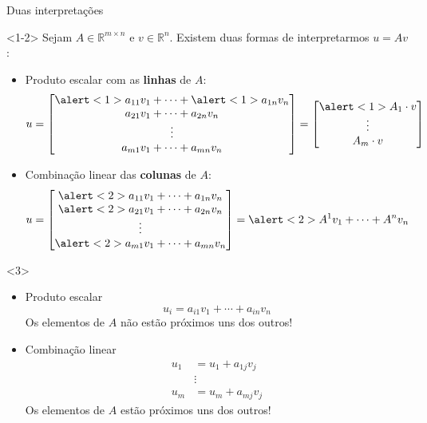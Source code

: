 \documentclass[]{beamer}
\newcommand{\R}{\mathbb{R}}
\begin{document}
\begin{frame}{Duas interpretações}
  
  \begin{onlyenv}<1-2>
    Sejam $A \in \R^{m \times n}$ e $v \in \R^n$. Existem duas formas
    de interpretarmos $u = A v$:

    \begin{itemize}
    \item Produto escalar com as \textbf{linhas} de $A$:
      \[
      u =
      \begin{bmatrix}
        \alert<1>{a_{11} v_1} + \cdots + \alert<1>{a_{1n} v_n}\\
        a_{21} v_1 + \cdots + a_{2n} v_n\\
        \vdots \\
        a_{m1} v_1 + \cdots + a_{mn} v_n
      \end{bmatrix}
      =
      \begin{bmatrix}
        \alert<1>{A_1 \cdot v} \\
        \vdots \\
        A_m \cdot v
      \end{bmatrix}
      \]

    \item Combinação linear das \textbf{colunas} de $A$:
      \[
      u =
      \begin{bmatrix}
        \alert<2>{a_{11} v_1} + \cdots + a_{1n} v_n\\
        \alert<2>{a_{21} v_1} + \cdots + a_{2n} v_n\\
        \vdots \\
        \alert<2>{a_{m1} v_1} + \cdots + a_{mn} v_n
      \end{bmatrix}
      = \alert<2>{A^1 v_1} + \cdots + A^n v_n
      \]
    \end{itemize}
  \end{onlyenv}

  \begin{onlyenv}<3>

    \begin{itemize}
    \item Produto escalar
      \[
      u_i = a_{i1} v_1 + \cdots + a_{in} v_n
      \]
      Os elementos de $A$ não estão próximos uns dos outros!

    \item Combinação linear
      \[
      \begin{aligned}
        u_1 & = u_1 + a_{1j} v_j\\
        & \vdots \\
        u_m &  = u_m + a_{mj} v_j
      \end{aligned}
      \]
      Os elementos de $A$ estão próximos uns dos outros!
    \end{itemize}
    
  \end{onlyenv}

\end{frame}
\end{document}
